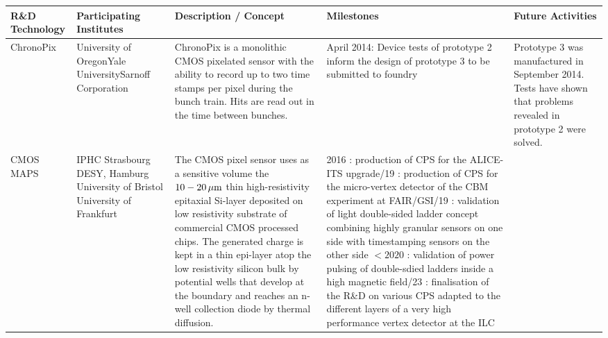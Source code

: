 \thispagestyle{empty}
\begin{landscape}
\begin{sidewaystable}
    \centering
    \begin{adjustbox}{max width=1.1\textwidth,totalheight=1\textheight}
\begin{tabularx}{2\textheight}{lXXXX}
    \toprule
    R\&D Technology & Participating Institutes & Description / Concept & Milestones & Future Activities \\
    \midrule
        ChronoPix &
        University of Oregon\newline Yale University\newline Sarnoff Corporation &
        ChronoPix is a monolithic CMOS pixelated sensor with the ability to record up to two time stamps per pixel during the bunch train. Hits are read out in the time between bunches. &
        April 2014: Device tests of prototype 2 inform the design of prototype 3 to be submitted to foundry &
        Prototype 3 was manufactured in September 2014. Tests have shown that problems revealed in prototype 2 were solved. \\
    \midrule
        CMOS MAPS &
        IPHC Strasbourg \newline DESY, Hamburg \newline University of Bristol \newline University of Frankfurt &
        The CMOS pixel sensor uses as a sensitive volume the $\unit[10-20]{\micron}$ thin high-resistivity epitaxial Si-layer deposited on low resistivity substrate of commercial CMOS processed chips. The generated charge is kept in a thin epi-layer atop the low resistivity silicon bulk by potential wells that develop at the boundary and reaches an n-well collection diode by thermal diffusion. &
        2016 : production of CPS for the ALICE-ITS upgrade\newline
        2018/19 : production of CPS for the micro-vertex detector of the CBM experiment at FAIR/GSI\newline
        2018/19 : validation of light double-sided ladder concept combining highly granular sensors on one side with timestamping sensors on the other side\newline
        $< 2020$ : validation of power pulsing of double-sdied ladders inside a high magnetic field\newline
        2022/23 : finalisation of the R\&D on various CPS adapted to the different layers of a very high performance vertex detector at the ILC &

\end{tabularx}
\end{adjustbox}
\end{sidewaystable}
\end{landscape}
